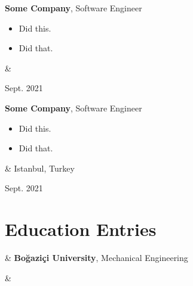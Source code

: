 \documentclass[10pt, letterpaper]{article}
\newenvironment{highlights}{
        \begin{itemize}[
                topsep=0pt,
                parsep=0.10 cm,
                partopsep=0pt,
                itemsep=0pt,
                after=\vspace{-1\baselineskip},
                leftmargin=0.4 cm + 3pt
            ]
    }{
        \end{itemize}
    } %
\let\originalTabularx\tabularx
\let\originalEndTabularx\endtabularx
\renewenvironment{tabularx}{\bgroup\centering\originalTabularx}{\originalEndTabularx\par\egroup}
\begin{document}
        \vspace{0.2 cm}
        \begin{tabularx}{
            \textwidth-0.4 cm-0.13cm
        }{
            K{0.2 cm}
            R{4.1 cm}
        }
            \textbf{Some Company}, Software Engineer

            \vspace{0.10 cm}

            \begin{highlights}
                \item Did this.
                \item Did that.
            \end{highlights}
            &
            

            Sept. 2021
        \end{tabularx}

        \vspace{0.2 cm}
        \begin{tabularx}{
            \textwidth-0.4 cm-0.13cm
        }{
            K{0.2 cm}
            R{4.1 cm}
        }
            \textbf{Some Company}, Software Engineer

            \vspace{0.10 cm}

            \begin{highlights}
                \item Did this.
                \item Did that.
            \end{highlights}
            &
            Istanbul, Turkey

            Sept. 2021
        \end{tabularx}


    
    \section{Education Entries}

        \begin{tabularx}{
            \textwidth-0.4 cm-0.13cm
        }{
            L{0.85cm}
            K{0.2 cm}
            R{4.1 cm}
        }
            \textbf{}
            &
            \textbf{Boğaziçi University}, Mechanical Engineering

            \vspace{0.10 cm}

            &
            

            
        \end{tabularx}
\end{document}
